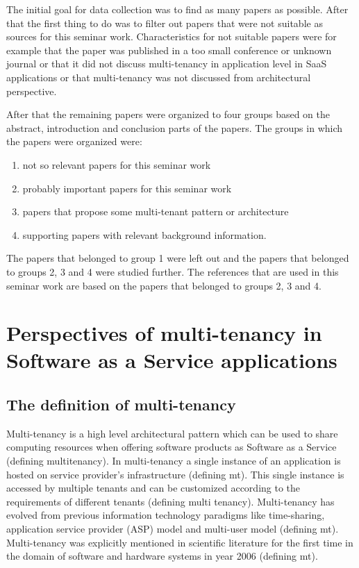 \documentclass[conference]{sasmoota2017}
\begin{document}
The initial goal for data collection was to find as many papers as possible. After that the first thing to do was to filter out papers that were not suitable as sources for this seminar work. Characteristics for not suitable papers were for example that the paper was published in a too small conference or unknown journal or that it did not discuss multi-tenancy in application level in SaaS applications or that multi-tenancy was not discussed from architectural perspective. 

After that the remaining papers were organized to four groups based on the abstract, introduction and conclusion parts of the papers. The groups in which the papers were organized were: 
\begin{enumerate}
\item not so relevant papers for this seminar work
\item probably important papers for this seminar work
\item papers that propose some multi-tenant pattern or architecture
\item supporting papers with relevant background information.
\end{enumerate}
The papers that belonged to group 1 were left out and the papers that belonged to groups 2, 3 and 4 were studied further. The references that are used in this seminar work are based on the papers that belonged to groups 2, 3 and 4. 


\section{Perspectives of multi-tenancy in Software as a Service applications}

\subsection{The definition of multi-tenancy}


Multi-tenancy is a high level architectural pattern which can be used to share computing resources when offering software products as Software as a Service (defining multitenancy). In multi-tenancy a single instance of an application is hosted on service provider’s infrastructure (defining mt). This single instance is accessed by multiple tenants and can be customized according to the requirements of different tenants (defining multi tenancy). Multi-tenancy has evolved from previous information technology paradigms like time-sharing, application service provider (ASP) model and multi-user model (defining mt). Multi-tenancy was explicitly mentioned in scientific literature for the first time in the domain of software and hardware systems in year 2006 (defining mt). 
\end{document}
